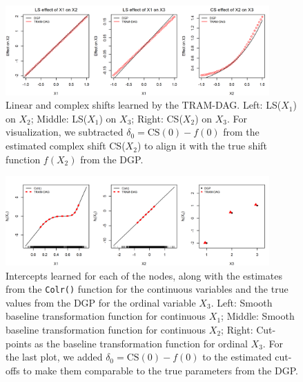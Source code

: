 \begin{figure}[htbp]
\centering
\includegraphics[width=0.9\textwidth]{img/exp1_LS_CS.png}
\caption{Linear and complex shifts learned by the TRAM-DAG. Left: LS($X_1$) on $X_2$; Middle: LS($X_1$) on $X_3$; Right: CS($X_2$) on $X_3$. For visualization, we subtracted $\delta_0 = \text{CS}(0) - f(0)$ from the estimated complex shift CS($X_2$) to align it with the true shift function $f(X_2)$ from the DGP.}
\label{fig:exp1_shifts}
\end{figure}



\begin{figure}[htbp]
\centering
\includegraphics[width=0.9\textwidth]{img/exp1_baseline_trafo.png}
\caption{Intercepts learned for each of the nodes, along with the estimates from the \texttt{Colr()} function for the continuous variables and the true values from the DGP for the ordinal variable $X_3$. Left: Smooth baseline transformation function for continuous $X_1$; Middle: Smooth baseline transformation function for continuous $X_2$; Right: Cut-points as the baseline transformation function for ordinal $X_3$. For the last plot, we added $\delta_0 = \text{CS}(0) - f(0)$ to the estimated cut-offs to make them comparable to the true parameters from the DGP.}
\label{fig:exp1_intercepts}
\end{figure}




